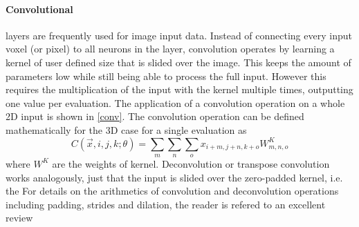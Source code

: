 \paragraph{Convolutional} layers are frequently used for image input data.
Instead of connecting every input voxel (or pixel) to all neurons in the layer, convolution operates by learning a kernel of user defined size that is slided over the image.
This keeps the amount of parameters low while still being able to process the full input.
However this requires the multiplication of the input with the kernel multiple times, outputting one value per evaluation.
The application of a convolution operation on a whole 2D input is shown in \ref{conv}.
The convolution operation can be defined mathematically for the 3D case for a single evaluation as
\[ C(\overrightarrow{x}, i, j, k; \theta) = \sum_m \sum_n \sum_o x_{i + m, j+n, k+o} W^K_{m, n, o} \]
where $W^K$ are the weights of kernel.
Deconvolution or transpose convolution works analogously, just that the input is slided over the zero-padded kernel, i.e. the
For details on the arithmetics of convolution and deconvolution operations including padding, strides and dilation, the reader is refered to an excellent review~\autocite{dumoulin_guide_2018}

